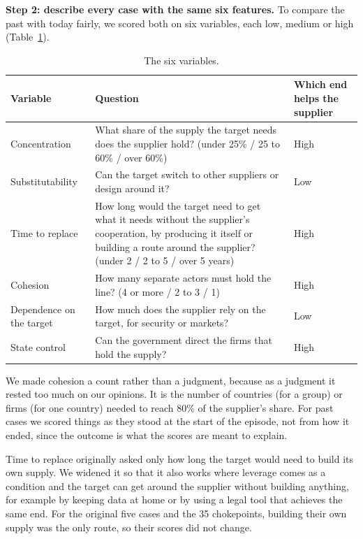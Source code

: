 \documentclass[11pt]{article}
\begin{document}
\textbf{Step 2: describe every case with the same six features.} To compare the past with today fairly, we scored both on six variables, each low, medium or high (Table~\ref{tab:variables}).

\begin{table}[htbp]
\centering\small
\begin{tabularx}{\linewidth}{@{}l X l@{}}
\toprule
\textbf{Variable} & \textbf{Question} & \textbf{Which end helps the supplier}\\
\midrule
Concentration & What share of the supply the target needs does the supplier hold? (under 25\% / 25 to 60\% / over 60\%) & High\\
Substitutability & Can the target switch to other suppliers or design around it? & Low\\
Time to replace & How long would the target need to get what it needs without the supplier's cooperation, by producing it itself or building a route around the supplier? (under 2 / 2 to 5 / over 5 years) & High\\
Cohesion & How many separate actors must hold the line? (4 or more / 2 to 3 / 1) & High\\
Dependence on the target & How much does the supplier rely on the target, for security or markets? & Low\\
State control & Can the government direct the firms that hold the supply? & High\\
\bottomrule
\end{tabularx}
\caption{The six variables.}
\label{tab:variables}
\end{table}

We made cohesion a count rather than a judgment, because as a judgment it rested too much on our opinions. It is the number of countries (for a group) or firms (for one country) needed to reach 80\% of the supplier's share. For past cases we scored things as they stood at the start of the episode, not from how it ended, since the outcome is what the scores are meant to explain.

Time to replace originally asked only how long the target would need to build its own supply. We widened it so that it also works where leverage comes as a condition and the target can get around the supplier without building anything, for example by keeping data at home or by using a legal tool that achieves the same end. For the original five cases and the 35 chokepoints, building their own supply was the only route, so their scores did not change.
\end{document}
